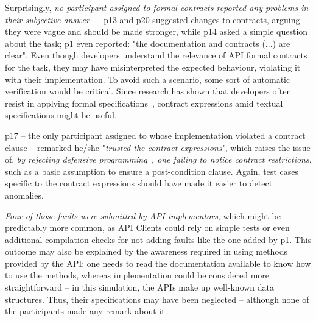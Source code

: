 Surprisingly, \emph{no participant assigned to formal contracts reported any problems in their subjective answer} –– p13 and p20 suggested changes to contracts, arguing they were vague and should be made stronger, while p14 asked a simple question about the task; p1 even reported: "the documentation and contracts (...) are clear".
Even though developers understand the relevance of API formal contracts for the task, they may have misinterpreted the expected behaviour, violating it with their implementation.
To avoid such a scenario, some sort of automatic verification would be critical.
Since research has shown that developers often resist in applying formal specifications~\cite{Polikarpova-etal09,Estler-etal14}, contract expressions amid textual specifications might be useful.

p17 -- the only participant assigned to \contractjdoc{} whose implementation violated a contract clause -- remarked he/she "\emph{trusted the contract expressions}", 
which raises the issue of, \emph{by rejecting defensive programming~\cite{dbc}, one failing to notice contract restrictions}, such as a basic assumption to ensure a post-condition clause.
Again, test cases specific to the contract expressions should have made it easier to detect anomalies.

\emph{Four of those faults were submitted by API implementors}, which might be predictably more common, as API Clients could rely on simple tests or even additional compilation checks for not adding faults like the one added by p1.
This outcome may also be explained by the awareness required in using methods provided by the API: one needs to read the documentation available to know how to use the methods, whereas implementation could be considered more straightforward -- in this simulation, 
the APIs make up well-known data structures. Thus, their specifications may have been neglected -- although none of the participants made any remark about it.

